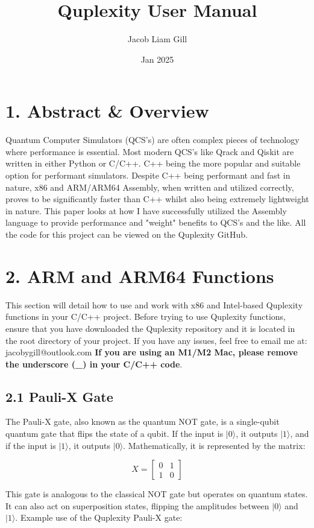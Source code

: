 \documentclass{article}
\title{Quplexity User Manual}
\author{Jacob Liam Gill}
\date{Jan 2025}
\begin{document}
\maketitle

\section*{1. Abstract \& Overview}
Quantum Computer Simulators (QCS's) are often complex pieces of technology where performance is essential.
Most modern QCS's like Qrack and Qiskit are written in either Python or C/C++.
C++ being the more popular and suitable option for performant simulators. Despite C++ being performant and fast in nature,
x86 and ARM/ARM64 Assembly, when written and utilized correctly, proves to be significantly faster than C++ whilst also being extremely lightweight in nature.
This paper looks at how I have successfully utilized the Assembly language to provide performance and "weight" benefits to QCS's and the like. All the code for this project can be viewed on the Quplexity GitHub.

\section*{2. ARM and ARM64 Functions}
This section will detail how to use and work with x86 and Intel-based Quplexity functions in your C/C++ project. Before trying to use Quplexity functions, ensure
that you have downloaded the Quplexity repository and it is located in the root directory of your project. If you have any issues, feel free to email me at: jacobygill@outlook.com
\textbf{If you are using an M1/M2 Mac, please remove the underscore (\_) in your C/C++ code}.

\subsection*{2.1 Pauli-X Gate}
The Pauli-X gate, also known as the quantum NOT gate, is a single-qubit quantum gate that flips the state of a qubit. If the input is \(|0\rangle\), it outputs \(|1\rangle\), and if the input is \(|1\rangle\), it outputs \(|0\rangle\). Mathematically, it is represented by the matrix:

\[
X = \begin{bmatrix}
0 & 1 \\
1 & 0
\end{bmatrix}
\]

This gate is analogous to the classical NOT gate but operates on quantum states. It can also act on superposition states, flipping the amplitudes between \(|0\rangle\) and \(|1\rangle\).
Example use of the Quplexity Pauli-X gate:
\end{document}
